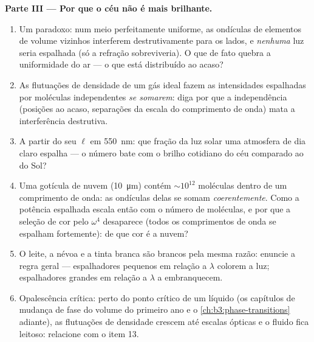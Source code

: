 \begin{problem}
\medskip\noindent\textbf{Parte III --- Por que o céu não é mais
brilhante.}
\begin{enumerate}[resume]
  \item Um paradoxo: num meio perfeitamente uniforme, as ondículas de
        elementos de volume vizinhos interferem destrutivamente para os
        lados, e \emph{nenhuma} luz seria espalhada (só a refração
        sobreviveria). O que de fato quebra a uniformidade do ar --- o
        que está distribuído ao acaso?
  \item As flutuações de densidade de um gás ideal fazem as
        intensidades espalhadas por moléculas independentes \emph{se
        somarem}: diga por que a independência (posições ao acaso,
        separações da escala do comprimento de onda) mata a
        interferência destrutiva.
  \item A partir do seu $\ell$ em \qty{550}{nm}: que fração da luz
        solar uma atmosfera de dia claro espalha --- o número bate com
        o brilho cotidiano do céu comparado ao do Sol?
  \item Uma gotícula de nuvem (\qty{10}{\micro m}) contém
        $\sim10^{12}$ moléculas dentro de um comprimento de onda: as
        ondículas delas se somam \emph{coerentemente}. Como a potência
        espalhada escala então com o número de moléculas, e por que a
        seleção de cor pelo $\omega^4$ desaparece (todos os
        comprimentos de onda se espalham fortemente): de que cor é a
        nuvem?
  \item O leite, a névoa e a tinta branca são brancos pela mesma razão:
        enuncie a regra geral --- espalhadores pequenos em relação a
        $\lambda$ colorem a luz; espalhadores grandes em relação a
        $\lambda$ a embranquecem.
  \item Opalescência crítica: perto do ponto crítico de um líquido
        (os capítulos de mudança de fase do volume do primeiro ano e o
        \cref{ch:b3:phase-transitions} adiante), as flutuações de densidade crescem até escalas ópticas
        e o fluido fica leitoso: relacione com o item 13.
\end{enumerate}


\end{problem}
